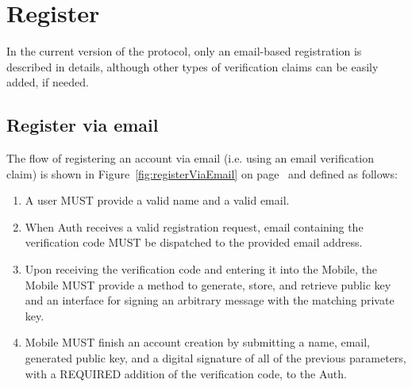 \section{Register}
 In the current version of the protocol, only an email-based registration is described in details, although 	
other types of verification claims can be easily added, if needed.

    \subsection{Register via email}
    The flow of registering an account via email (i.e. using an email verification claim) is shown in 
    Figure~\ref{fig:registerViaEmail} on page~\pageref{fig:register-via-email} and defined as follows:
    \begin{enumerate}
        \item A user MUST provide a valid name and a valid email.
        \item When Auth receives a valid registration request, email containing the verification code MUST 
              be dispatched to the provided email address.
        \item Upon receiving the verification code and entering it into the Mobile, the Mobile MUST provide 
              a method to generate, store, and retrieve public key and an interface for signing an arbitrary 
              message with the matching private key.
        \item Mobile MUST finish an account creation by submitting a name, email, generated public key, and 
              a digital signature of all of the previous parameters, with a REQUIRED addition of the 
              verification code, to the Auth.
    \end{enumerate}  
    

